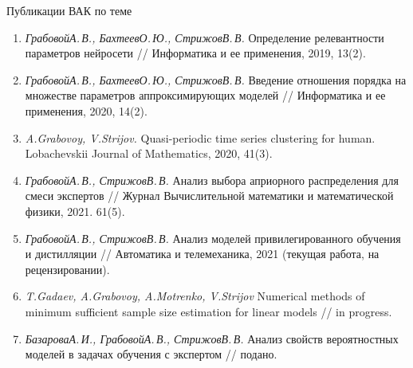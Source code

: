 \documentclass[10pt,pdf,hyperref={unicode}]{beamer}
\begin{document}
\begin{frame}{Публикации ВАК по теме}
\justifying
\begin{enumerate}
\item \textit{Грабовой\;А.\,В., Бахтеев\;О.\,Ю., Стрижов\;В.\,В.} Определение релевантности параметров нейросети // Информатика и ее применения, 2019, 13(2).
\item \textit{Грабовой\;А.\,В., Бахтеев\;О.\,Ю., Стрижов\;В.\,В.} Введение отношения порядка на множестве параметров аппроксимирующих моделей // Информатика и ее применения, 2020, 14(2).
\item \textit{A.\;Grabovoy, V.\;Strijov.} Quasi-periodic time series clustering for human. Lobachevskii Journal of Mathematics, 2020, 41(3).
\item \textit{Грабовой\;А.\,В., Стрижов\;В.\,В.} Анализ выбора априорного распределения для смеси экспертов // Журнал Вычислительной математики и математической физики, 2021. 61(5).
\item \textit{Грабовой\;А.\,В., Стрижов\;В.\,В.} Анализ моделей привилегированного обучения и дистилляции // Автоматика и телемеханика, 2021 (текущая работа, на рецензировании).
\item \textit{T.\;Gadaev, A.\;Grabovoy, A.\;Motrenko, V.\;Strijov} Numerical methods of minimum sufficient sample size estimation for linear models // in progress.
\item \textit{Базарова\;А.\,И., Грабовой\;А.\,В., Стрижов\;В.\,В.} Анализ свойств вероятностных моделей в задачах обучения с экспертом // подано.
\end{enumerate}

\end{frame}
\end{document}
